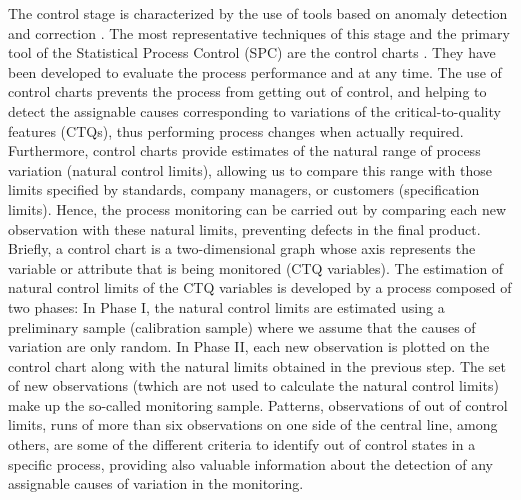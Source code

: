 The control stage is characterized by the use of tools based on anomaly detection and correction \citep{montgomery2009introduction}. The most representative techniques of this stage and the primary tool of the Statistical Process Control (SPC) are the control charts \citep{champ1987exact}. They have been developed to evaluate the process performance and at any time. The use of control charts prevents the process from getting out of control, and helping to detect the assignable causes corresponding to variations of the critical-to-quality features (CTQs), thus performing process changes when actually required. Furthermore, control charts provide estimates of the natural range of process variation (natural control limits), allowing us to compare this range with those limits specified by standards, company managers, or customers (specification limits). Hence, the process monitoring can be carried out by comparing each new observation with these natural limits, preventing defects in the final product. Briefly, a control chart is a two-dimensional graph whose axis represents the variable or attribute that is being monitored (CTQ variables). %
The estimation of natural control limits of the CTQ variables is developed by a process composed of two phases: In Phase I, the natural control limits are estimated using a preliminary sample (calibration sample) where we assume that the causes of variation are only random. In Phase II, each new observation is plotted on the control chart along with the natural limits obtained in the previous step. The set of new observations (twhich are not used to calculate the natural control limits) make up the so-called monitoring sample. Patterns, observations of out of control limits, runs of more than six observations on one side of the central line, among others, are some of the different criteria to identify out of control states in a specific process, providing also valuable information about the detection of any assignable causes of variation in the monitoring. \\

